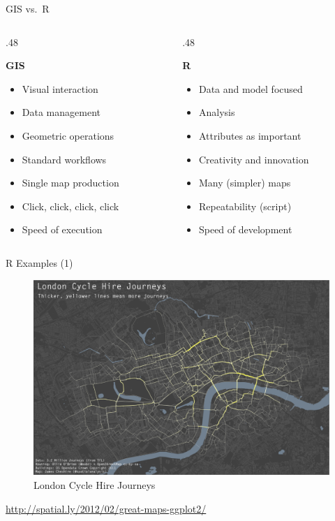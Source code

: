 \documentclass[10pt,ignorenonframetext,]{beamer}
\providecommand{\tightlist}{%
  \setlength{\itemsep}{0pt}\setlength{\parskip}{0pt}}
\def\begincols{\begin{columns}}
\def\begincol{\begin{column}}
\def\endcol{\end{column}}
\def\endcols{\end{columns}}
\begin{document}
\begin{frame}{GIS vs.~R}

\begincols
\begincol{.48\textwidth}

\textbf{GIS}

\begin{itemize}
\tightlist
\item
  Visual interaction
\item
  Data management
\item
  Geometric operations
\item
  Standard workflows
\item
  Single map production
\item
  Click, click, click, click
\item
  Speed of execution
\end{itemize}

\endcol
\begincol{.48\textwidth}

\textbf{R}

\begin{itemize}
\tightlist
\item
  Data and model focused
\item
  Analysis
\item
  Attributes as important
\item
  Creativity and innovation
\item
  Many (simpler) maps
\item
  Repeatability (script)
\item
  Speed of development
\end{itemize}

\endcol
\endcols

\end{frame}

\begin{frame}{R Examples (1)}

\begin{figure}

{\centering \includegraphics[width=0.9\linewidth]{../images/bike_ggplot} 

}

\caption{London Cycle Hire Journeys}\label{fig:unnamed-chunk-4}
\end{figure}

\url{http://spatial.ly/2012/02/great-maps-ggplot2/}

\end{frame}
\end{document}
